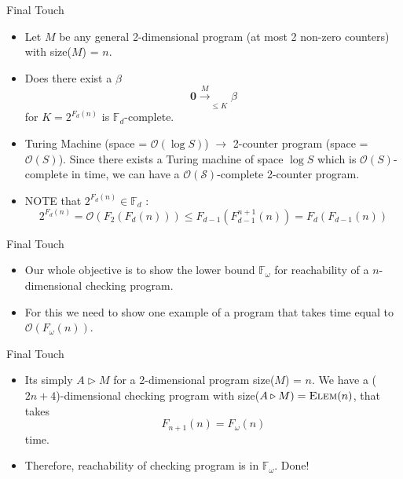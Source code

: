 \documentclass{beamer}
\renewcommand{\b}[1]{\boldsymbol{#1}}
\newcommand{\zero}[0]{\b{0}}
\newcommand{\prog}[1]{\xrightarrow[]{#1}}
\begin{document}
\begin{frame}{Final Touch}
    \begin{itemize}
        \item Let $M$ be any general 2-dimensional program (at most 2 non-zero counters) with size($M$) = $n$.
        \item Does there exist a $\beta$ 
        $$\zero \prog{M}_{\leq K} \beta$$
        for $K = 2^{F_d(n)}$ is $\mathbb{F}_d$-complete.
        \pause
        \item Turing Machine (space = $\mathcal{O}(\log S)$) $\longrightarrow$ 2-counter program (space = $\mathcal{O}(S)$). Since there exists a Turing machine of space $\log S$ which is $\mathcal{O}(S)$-complete in time, we can have a $\mathcal{O(S)}$-complete 2-counter program.  
        \item NOTE that $2^{F_d(n) } \in \mathbb{F}_d$ : $$2^{F_d(n)} = \mathcal{O}(F_2(F_d(n))) \leq F_{d-1}(F_{d-1}^{n+1}(n)) = F_d(F_{d-1}(n))$$
    \end{itemize}
\end{frame}

\begin{frame}{Final Touch}
    \begin{itemize}
        \item Our whole objective is to show the lower bound $\mathbb{F}_\omega$ for reachability of a $n$-dimensional checking program. 
        \item For this we need to show one example of a program that takes time equal to $\mathcal{O}(F_\omega(n))$.
        
    \end{itemize}
\end{frame}


\begin{frame}{Final Touch}
    \begin{itemize}
        \item Its simply $A\triangleright M$ for a 2-dimensional program size($M$) = $n$. We have a ($2n+4$)-dimensional checking program with size($A\triangleright M) = \textsc{Elem}(n)$, that takes $$F_{n+1}(n) = F_\omega(n)$$ time. 
        \item Therefore, reachability of checking program is in $\mathbb{F}_\omega$. Done!
    \end{itemize}
\end{frame}
\end{document}
